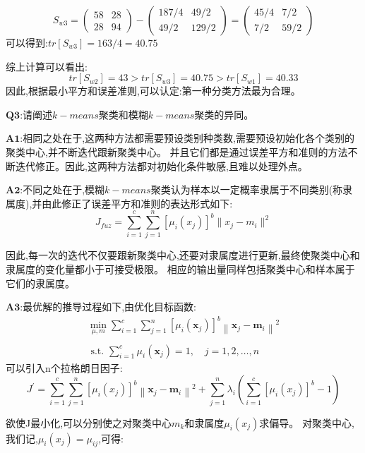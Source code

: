\documentclass[homework]{IEEEtran}
\begin{document}
\begin{CJK}{UTF8}{gkai}
\begin{enumerate}
$$
S_{w3} = \begin{pmatrix}58 & 28 \\28 & 94\end{pmatrix}-\begin{pmatrix}187/4 & 49/2\\ 49/2 & 129/2\end{pmatrix}
=\begin{pmatrix}45/4 & 7/2\\ 7/2 & 59/2\end{pmatrix}
$$
可以得到:$tr\left[S_{w3} \right] = 163/4 = 40.75$
\end{enumerate}
综上计算可以看出:
$$
tr[S_{w2}] = 43 > tr[S_{w3}] = 40.75 > tr[S_{w1}] = 40.33
$$
因此,根据最小平方和误差准则,可以认定:第一种分类方法最为合理。 \par
$\mathbf{Q3}$:请阐述$k-means$聚类和模糊$k-means$聚类的异同。\par
$\mathbf{A1}$:相同之处在于,这两种方法都需要预设类别种类数,需要预设初始化各个类别的聚类中心,并不断迭代跟新聚类中心。
并且它们都是通过误差平方和准则的方法不断迭代修正。因此,这两种方法都对初始化条件敏感,且难以处理外点。\par
$\mathbf{A2}$:不同之处在于,模糊$k-means$聚类认为样本以一定概率隶属于不同类别(称隶属度),并由此修正了误差平方和准则的表达形式如下:
$$
J_{fuz} = \sum\limits_{i=1}^{c} \sum\limits_{j=1}^{n}\left[\mu_i (x_j)\right]^b \rVert x_j - m_i \rVert ^2
$$ \par
因此,每一次的迭代不仅要跟新聚类中心,还要对隶属度进行更新,最终使聚类中心和隶属度的变化量都小于可接受极限。
相应的输出量同样包括聚类中心和样本属于它们的隶属度。 \par
$\mathbf{A3}$:最优解的推导过程如下,由优化目标函数:
$$
\begin{array}{l}
    \min _{\mu, m} \sum\limits_{i=1}^{c} \sum\limits_{j=1}^{n}\left[\mu_{i}\left(\mathbf{x}_{j}\right)\right]^{b}\left\|\mathbf{x}_{j}-\mathbf{m}_{i}\right\|^{2} \\
    \\
    \text { s.t. } \sum\limits_{i=1}^{c} \mu_{i}\left(\mathbf{x}_{j}\right)=1, \quad j=1,2, \ldots, n
    \end{array}
$$
可以引入n个拉格朗日因子:
$$
J^{\prime}=\sum\limits_{i=1}^{c} \sum\limits_{j=1}^{n} [\mu_i (x_j)]^{b}\left\|\mathbf{x}_{j}-\mathbf{m}_{i}\right\|^{2}
    +\sum\limits_{j=1}^{n} \lambda_{i}\left(\sum_{i=1}^{c} [\mu_i (x_j)]^{b}-1\right)
$$ \par
欲使J最小化,可以分别使之对聚类中心$m_k$和隶属度$\mu_i (x_j)$求偏导。
对聚类中心,我们记,$\mu_i (x_j) = \mu_{ij}$,可得:

\end{CJK}
\end{document}
